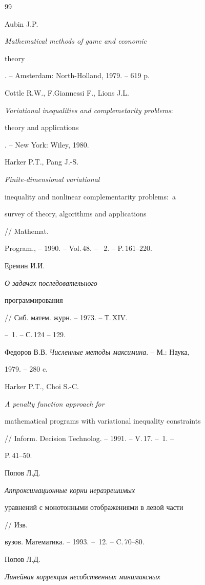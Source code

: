 \begin{thebibliography}{99}







Aubin J.P. {\em Mathematical methods of game and economic


theory}. -- Amsterdam: North-Holland, 1979. -- 619 p.




Cottle R.W., F.Giannessi F., Lions J.L.


{\em Variational inequalities and complemetarity problems$:$


theory and applications}. -- New York: Wiley, 1980.




Harker P.T., Pang J.-S. {\em Finite-dimensional variational


inequality and nonlinear complementarity problems$:$ a


survey of theory, algorithms and applications} // Mathemat.


Program., -- 1990. -- Vol.\,48. -- \No\, 2. -- P.\,161--220.




Еремин И.И. {\em О задачах последовательного


программирования} // Сиб. матем. журн. -- 1973. -- Т.\,XIV.


-- \No\,1. -- С.\,124 -- 129.




Федоров В.В. {\em Численные методы максимина}. -- М.: Наука,


1979. -- 280 c.




Harker P.T., Choi S.-C. {\em A penalty function approach for


mathematical programs with variational inequality constraints}


// Inform. Decision Technolog. -- 1991. -- V.\,17. -- \No\,1. --


P.\,41--50.




Попов Л.Д. {\em Аппроксимационные корни неразрешимых


уравнений с монотонными отображениями в левой части} // Изв.


вузов. Математика. -- 1993. -- \No\,12. -- C.\,70--80.




Попов Л.Д. {\em Линейная коррекция несобственных минимаксных


}
\end{thebibliography}
